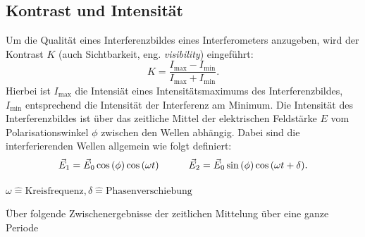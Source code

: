 \FloatBarrier
\subsection{Kontrast und Intensität}
Um die Qualität eines Interferenzbildes eines Interferometers anzugeben, wird der Kontrast $K$ (auch Sichtbarkeit, eng. \textit{visibility}) eingeführt:
\begin{equation}
	K = \frac{I_{\text{max}} - I_{\text{min}}} {I_{\text{max}} + I_{\text{min}}}.
	\label{eqn:kontrastohnewinkel}
\end{equation}
Hierbei ist $I_{\text{max}}$ die Intensiät eines Intensitätsmaximums des Interferenzbildes, $I_{\text{min}}$ entsprechend die Intensität der Interferenz am Minimum.
Die Intensität des Interferenzbildes ist über das zeitliche Mittel der elektrischen Feldstärke $E$ vom Polarisationswinkel $\phi$ zwischen den Wellen abhängig.
Dabei sind die interferierenden Wellen allgemein wie folgt definiert:
\begin{equation*}
	\vec{E}_{1} =  \vec{E}_{0} \cos{\left( \phi \right)} \cos{ \left( \omega t \right) } 			\quad \quad \quad
	\vec{E}_{2} =  \vec{E}_{0} \sin{\left( \phi \right)} \cos{ \left( \omega t + \delta \right) }. 	\\
\end{equation*}
\begin{center}
	\tiny{$\omega \widehat{=} \text{Kreisfrequenz}, \delta \widehat{=} \text{Phasenverschiebung} $}
\end{center}
Über folgende Zwischenergebnisse der zeitlichen Mittelung über eine ganze Periode
